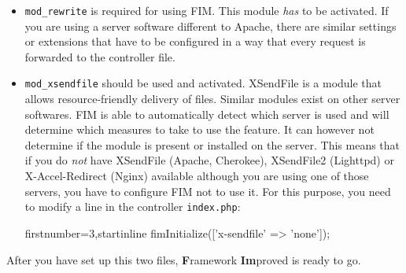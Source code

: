\documentclass{scrartcl}
\newcommand{\fim}{\textbf{F}ramework \textbf{Im}proved}
\begin{document}
      \begin{itemize}
         \item
            \texttt{mod\_rewrite} is required for using FIM. This module \emph{has} to be activated. If you are using a server software different to Apache, there are similar settings or extensions that have to be configured in a way that every request is forwarded to the controller file.
         \item
            \texttt{mod\_xsendfile} should be used and activated. XSendFile is a module that allows resource-friendly delivery of files. Similar modules exist on other server softwares. FIM is able to automatically detect which server is used and will determine which measures to take to use the feature. It can however not determine if the module is present or installed on the server. This means that if you do \emph{not} have XSendFile (Apache, Cherokee), XSendFile2 (Lighttpd) or X-Accel-Redirect (Nginx) available although you are using one of those servers, you have to configure FIM not to use it. For this purpose, you need to modify a line in the controller \texttt{index.php}:
            \begin{phpcode*}{firstnumber=3,startinline}
   fimInitialize(['x-sendfile' => 'none']);
            \end{phpcode*}
      \end{itemize}
      After you have set up this two files, \fim{} is ready to go.
\end{document}
